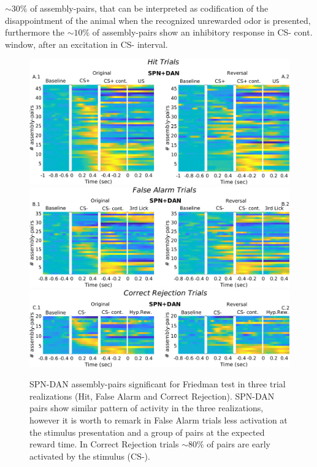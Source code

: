 $\sim30\%$ of assembly-pairs, that can be interpreted as codification of the disappointment of the animal when the recognized unrewarded odor is presented, furthermore the $\sim10\%$ of assembly-pairs show an inhibitory response in CS- cont. window, after an excitation in CS- interval.
\begin{figure}
\centering
\includegraphics[scale=0.36]{figures/HeatSPN_DANHit.png}
\includegraphics[scale=0.36]{figures/HeatFA_SPN_DAN1.png}
\includegraphics[scale=0.36]{figures/HeatCR_SPN_DAN1.png}
\caption{SPN-DAN assembly-pairs significant for Friedman test in three trial realizations (Hit, False Alarm and Correct Rejection). SPN-DAN pairs show similar pattern of activity in the three realizations, however it is worth to remark in False Alarm trials less activation at the stimulus presentation and a group of pairs at the expected reward time. In Correct Rejection trials $\sim 80\%$ of pairs are early activated by the stimulus (CS-).}
\label{fig:HeatSPN_DANComp}
\end{figure}
